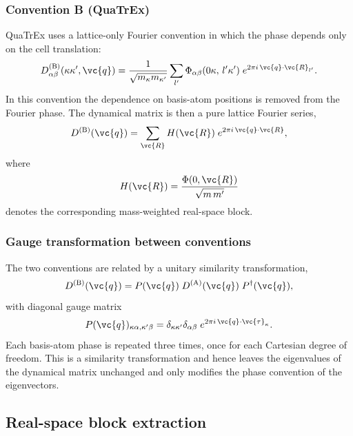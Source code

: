 \subsubsection{Convention B (QuaTrEx)}

QuaTrEx uses a lattice-only Fourier convention in which the phase
depends only on the cell translation:
\begin{equation}\label{eq:DB}
  D_{\alpha\beta}^{(\mathrm{B})}(\kappa\kappa',\vc{q})
  = \frac{1}{\sqrt{m_\kappa m_{\kappa'}}}
    \sum_{l'}
    \Phi_{\alpha\beta}(0\kappa,\,l'\kappa')\;
    e^{2\pi i\,\vc{q}\cdot \vc{R}_{l'}}.
\end{equation}
In this convention the dependence on basis-atom positions is removed
from the Fourier phase.  The dynamical matrix is then a pure lattice
Fourier series,
\begin{equation}\label{eq:fourier_series}
  D^{(\mathrm{B})}(\vc{q})
  = \sum_{\vc{R}} H(\vc{R})\;e^{2\pi i\,\vc{q}\cdot\vc{R}},
\end{equation}
where
\begin{equation}
  H(\vc{R}) = \frac{\Phi(0,\vc{R})}{\sqrt{m\,m'}}
\end{equation}
denotes the corresponding mass-weighted real-space block.

\subsubsection{Gauge transformation between conventions}
\label{sec:gauge}

The two conventions are related by a unitary similarity
transformation,
\begin{equation}\label{eq:gauge_eq}
  D^{(\mathrm{B})}(\vc{q})
  = P(\vc{q})\;D^{(\mathrm{A})}(\vc{q})\;P^\dagger(\vc{q}),
\end{equation}
with diagonal gauge matrix
\begin{equation}\label{eq:P}
  P(\vc{q})_{\kappa\alpha,\kappa'\beta}
  = \delta_{\kappa\kappa'}\delta_{\alpha\beta}\;
    e^{2\pi i\,\vc{q}\cdot\vc{\tau}_\kappa}.
\end{equation}
Each basis-atom phase is repeated three times, once for each Cartesian
degree of freedom. This is a similarity transformation and hence leaves
the eigenvalues of the dynamical matrix unchanged and only modifies the
phase convention of the eigenvectors.

\subsection{Real-space block extraction}
\label{sec:blocks}

